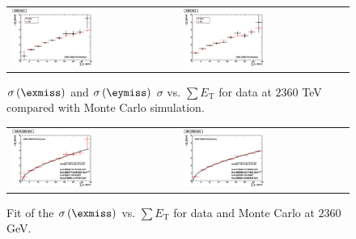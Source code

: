 \begin{figure}[h!]
 \centering
 \begin{tabular}{ll}
  \includegraphics[width=0.5\textwidth]{plots_DataVsMC_MB_2360GeV/h_metxsigma_sumet_2360.eps} &
  \includegraphics[width=0.5\textwidth]{plots_DataVsMC_MB_2360GeV/h_metysigma_sumet_2360.eps} \\
 \end{tabular}
 \caption{\small $\sigma\left(\exmiss\right)$ and $\sigma\left(\eymiss\right)$ $\sigma$ vs. $\sum E_\text{T}$ for
          data at $2360$ TeV compared with Monte Carlo simulation.\label{fig:MExySigma_vs_SumET_2360}}
\end{figure}

\begin{figure}[h!]
 \centering
 \begin{tabular}{ll}
  \includegraphics[width=0.5\textwidth]{plots_DataVsMC_MB_2360GeV/final_metxsigma_sumet_DATA_2360.eps} &
  \includegraphics[width=0.5\textwidth]{plots_DataVsMC_MB_2360GeV/final_metxsigma_sumet_MC_2360.eps} \\
 \end{tabular}
 \caption{\small Fit of the $\sigma\left(\exmiss\right)$ vs. $\sum E_\text{T}$ for data and Monte Carlo at $2360$ GeV.\label{fig:MExSigma_vs_SumET_2360_fit}}
\end{figure}


